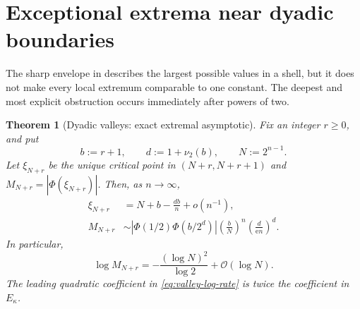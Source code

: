 \documentclass[11pt,oneside]{article}
\newtheorem{theorem}{Theorem}[section]
\theoremstyle{definition}
\theoremstyle{remark}
\newcommand{\e}{\mathrm e}
\newcommand{\Phiup}{\Phi}
\newcommand{\bigO}{\mathcal O}
\newcommand{\vtwo}{\nu_2}
\newcommand{\abs}[1]{\left|#1\right|}
\begin{document}
\section{Exceptional extrema near dyadic boundaries}
\label{sec:exceptional-extrema}

The sharp envelope in  describes the largest possible values in
a shell, but it does not make every local extremum comparable to one constant.  The deepest
and most explicit obstruction occurs immediately after powers of two.

\begin{theorem}[Dyadic valleys: exact extremal asymptotic]
\label{thm:dyadic-valleys}
Fix an integer $r\ge0$, and put
\[
 b:=r+1,
 \qquad
 d:=1+\vtwo(b),
 \qquad
 N:=2^{n-1}.
\]
Let $\xi_{N+r}$ be the unique critical point in $(N+r,N+r+1)$ and
$M_{N+r}=\abs{\Phiup(\xi_{N+r})}$.  Then, as $n\to\infty$,
\begin{align}
 \xi_{N+r}
 &=N+b-\frac{db}{n}+o(n^{-1}),
 \label{eq:valley-location}\\
 M_{N+r}
 &\sim
 \abs{\Phiup(1/2)\Phiup(b/2^d)}
 \left(\frac bN\right)^n
 \left(\frac d{\e n}\right)^d.
 \label{eq:valley-amplitude}
\end{align}
In particular,
\begin{equation}
 \log M_{N+r}
 =-\frac{(\log N)^2}{\log2}+\bigO(\log N).
 \label{eq:valley-log-rate}
\end{equation}
The leading quadratic coefficient in \eqref{eq:valley-log-rate} is twice the coefficient in
$E_\kappa$.
\end{theorem}
\end{document}
